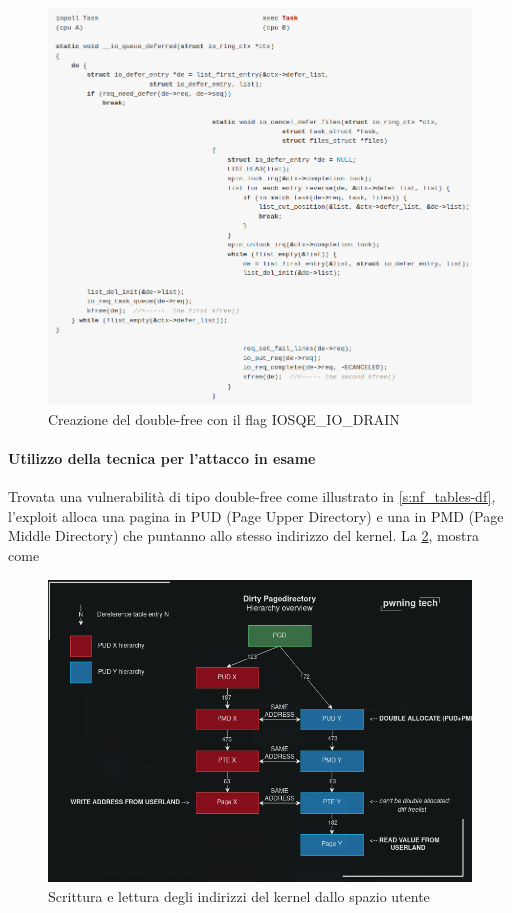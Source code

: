 \documentclass{article}
\begin{document}
\begin{figure}[h]
  \begin{center}
    \includegraphics[width=.85\textwidth]{figures/ch1/dirtypt_2-df.png}
  \end{center}
  \caption{Creazione del double-free con il flag IOSQE\_IO\_DRAIN}\label{fig:dirty-df}
\end{figure}

\paragraph{Utilizzo della tecnica per l'attacco in esame} Trovata una vulnerabilità di tipo 
double-free come illustrato in \cref{s:nf_tables-df},  
l'exploit alloca una pagina in PUD (Page Upper Directory) e una in PMD (Page Middle Directory) 
che puntanno allo stesso indirizzo del kernel. La \cref{fig:dirtypt-nftables}, 
mostra come 

\begin{figure}[h]
  \begin{center}
    \includegraphics[width=.6\textwidth]{figures/ch1/dirtypt_current.png}
  \end{center}
  \caption{Scrittura e lettura degli indirizzi del kernel dallo spazio utente}\label{fig:dirtypt-nftables}
\end{figure}
\end{document}
